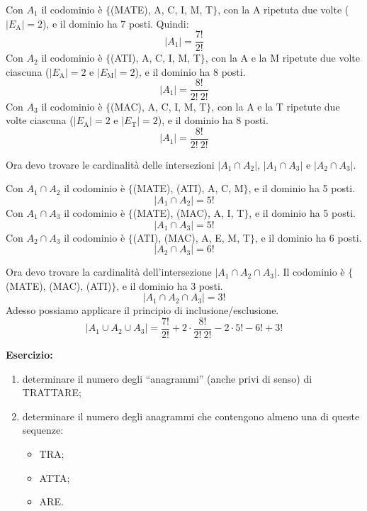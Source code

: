 Con $A_1$ il codominio \`e $\{ $(MATE), A, C, I, M, T$\}$, con la A ripetuta due volte ($|E_{\text{A}}| = 2$), e il dominio ha 7 posti. Quindi:
\[
|A_1| = \frac{7!}{2!}
\]
Con $A_2$ il codominio \`e $\{ $(ATI), A, C, I, M, T$\}$, con la A e la M ripetute due volte ciascuna ($|E_{\text{A}}| = 2$ e $|E_{\text{M}}| = 2$), e il dominio ha 8 posti.
\[
|A_1| = \frac{8!}{2! \ 2!}
\]
Con $A_3$ il codominio \`e $\{ $(MAC), A, C, I, M, T$\}$, con la A e la T ripetute due volte ciascuna ($|E_{\text{A}}| = 2$ e $|E_{\text{T}}| = 2$), e il dominio ha 8 posti.
\[
|A_1| = \frac{8!}{2! \ 2!}
\]

Ora devo trovare le cardinalit\`a delle intersezioni $|A_1 \cap A_2|$, $|A_1 \cap A_3|$ e $|A_2 \cap A_3|$.

Con $A_1 \cap A_2$ il codominio \`e $\{ $(MATE), (ATI), A, C, M$\}$, e il dominio ha 5 posti.
\[
|A_1 \cap A_2| = 5!
\]
Con $A_1 \cap A_3$ il codominio \`e $\{ $(MATE), (MAC), A, I, T$\}$, e il dominio ha 5 posti.
\[
|A_1 \cap A_3| = 5!
\]
Con $A_2 \cap A_3$ il codominio \`e $\{ $(ATI), (MAC), A, E, M, T$\}$, e il dominio ha 6 posti.
\[
|A_2 \cap A_3| = 6!
\]

Ora devo trovare la cardinalit\`a dell'intersezione $|A_1 \cap A_2 \cap A_3|$. Il codominio \`e $\{ $(MATE), (MAC), (ATI)$\}$, e il dominio ha 3 posti.
\[
|A_1 \cap A_2 \cap A_3| = 3!
\]
Adesso possiamo applicare il principio di inclusione/esclusione.
\[
|A_1 \cup A_2 \cup A_3| = 
\frac{7!}{2!} + 2 \cdot \frac{8!}{2! \ 2!} - 2 \cdot 5! - 6! + 3!
\]

\textbf{Esercizio:} 
\begin{enumerate}
  \item determinare il numero degli ``anagrammi'' (anche privi di senso) di TRATTARE;
  \item determinare il numero degli anagrammi che contengono almeno una di queste sequenze:
  \begin{itemize}
    \item TRA;
    \item ATTA;
    \item ARE.
  \end{itemize}
\end{enumerate}

